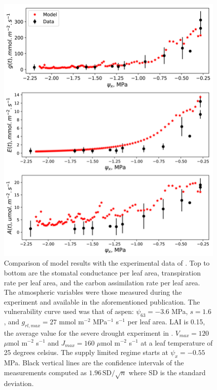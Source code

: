 \documentclass[utf8]{frontiersSCNS} %
\begin{document}
\begin{figure}[h]
    \begin{center}
         \includegraphics[scale=0.16]{Data_Model.jpg}   
    \end{center}
    \caption{Comparison of model results with the experimental data of \citep{venturas_2018}. Top to bottom are the stomatal conductance per leaf area, transpiration rate per leaf area, and the carbon assimilation rate per leaf area. The atmospheric variables were those measured during the experiment and available in the aforementioned publication. The vulnerability curve used was that of aspen: $\psi_{63} = -3.6$ MPa, $s=1.6$, and $g_{rl,max} = 27$ mmol m$^{-2}$ MPa$^{-1}$ s$^{-1}$ per leaf area. LAI is 0.15, the average value for the severe drought experiment in \citep{venturas_2018}. $V_{max} = 120$ $\mu$mol m$^{-2}$ s$^{-1}$ and $J_{max} = 160$ $\mu$mol m$^{-2}$ s$^{-1}$ at a leaf temperature of 25 degrees celsius. The supply limited regime starts at $\psi_x = -0.55$ MPa. Black vertical lines are the confidence intervals of the measurements computed as $1.96\, \text{SD}/\sqrt{n}$ where SD is the standard deviation.} 
    \label{fig:data_model}
\end{figure}
\end{document}
